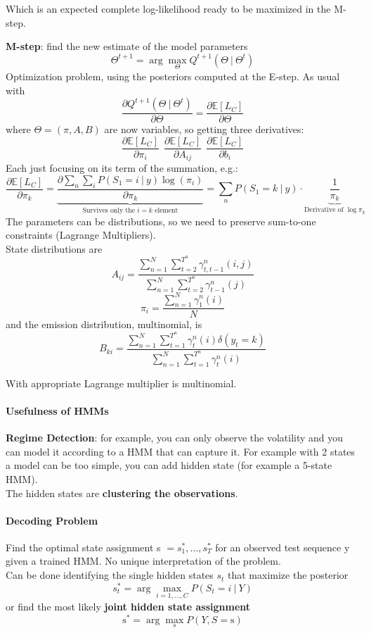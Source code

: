 \documentclass[10pt]{report}
\begin{document}
\begin{list}{}{}
	Which is an expected complete log-likelihood ready to be maximized in the M-step.
	\item \textbf{M-step}: find the new estimate of the model parameters $$\Theta^{t+1} = \arg\max_\Theta Q^{t+1}(\Theta\:|\:\Theta^t)$$
	Optimization problem, using the posteriors computed at the E-step. As usual with $$\frac{\partial Q^{t+1}(\Theta\:|\:\Theta^t)}{\partial\Theta}=\frac{\partial \mathbb{E}[L_C]}{\partial\Theta}$$
	where $\Theta = (\pi, A, B)$ are now variables, so getting three derivatives:
			$$\frac{\partial \mathbb{E}[L_C]}{\partial\pi_i}\:\:\frac{\partial \mathbb{E}[L_C]}{\partial A_{ij}}\:\:\frac{\partial \mathbb{E}[L_C]}{\partial b_i}$$
		Each just focusing on its term of the summation, e.g.:
			$$\frac{\partial \mathbb{E}[L_C]}{\partial \pi_k}=\underset{\text{Survives only the }i=k\text{ element}}{\underbrace{\frac{\partial \sum_n\sum_iP(S_1=i\:|\:y)\log(\pi_i)}{\partial \pi_k}}} = \sum_nP(S_1=k\:|\:y)\cdot\underset{\text{Derivative of }\log\pi_k}{\underbrace{ \frac{1}{\pi_k}}}$$
	The parameters can be distributions, so we need to preserve sum-to-one constraints (Lagrange Multipliers).\\
	State distributions are
	$$A_{ij}=\frac{\sum_{n=1}^N\sum_{t=2}^{T^n} \gamma_{t,t-1}^n(i,j)}{\sum_{n=1}^N\sum_{t=2}^{T^n}\gamma_{t-1}^n(j)}$$
	$$\pi_i=\frac{\sum_{n=1}^N\gamma_1^n(i)}{N}$$
	and the emission distribution, multinomial, is
	$$B_{ki} = \frac{\sum_{n=1}^N\sum_{t=1}^{T^n}\gamma_t^n(i)\delta(y_t=k)}{\sum_{n=1}^N\sum_{t=1}^{T^n}\gamma_t^n(i)}$$
\end{list}
With appropriate Lagrange multiplier is multinomial.
\paragraph{Usefulness of HMMs}\begin{list}{}{}
	\item \textbf{Regime Detection}: for example, you can only observe the volatility and you can model it according to a HMM that can capture it. For example with 2 states a model can be too simple, you can add hidden state (for example a 5-state HMM).\\
	The hidden states are \textbf{clustering the observations}.
\end{list}
\paragraph{Decoding Problem} Find the optimal state assignment s $= s_1^*,\ldots,s_T^*$ for an observed test sequence y given a trained HMM. No unique interpretation of the problem.\\
Can be done identifying the single hidden states $s_t$ that maximize the posterior $$s_t^*=\arg\max_{i=1,\ldots,C}P(S_t=i\:|\:Y)$$ 
or find the most likely \textbf{joint hidden state assignment} 
$$\text{s}^* = \arg\max_s P(Y,S = \text{s})$$
\end{document}
